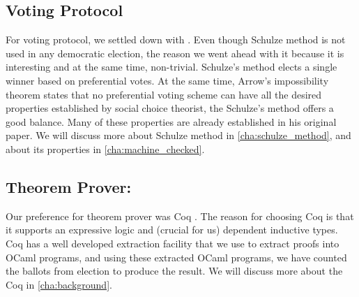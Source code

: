  \subsection{Voting Protocol}
 For voting protocol, we settled down with \cite{Schulze:2011:NMC}.
 Even though Schulze method is not used in any democratic election, the reason 
 we went ahead with it because it is interesting  and at the same time, non-trivial. 
 Schulze's method elects  a single winner based on 
preferential votes.  At the same time, Arrow's impossibility theorem \citep{Arrow:1950:DCS} states
 that no preferential voting 
scheme can have all the desired properties established by  social choice theorist,
the Schulze's method offers a good balance. Many of these properties are already 
established in his original paper.  We will discuss more about Schulze method in 
\ref{cha:schulze_method}, and about its properties in \ref{cha:machine_checked}. 

\subsection{Theorem Prover:}
Our preference for theorem prover was Coq \citep{Bertot:2004:ITP}. The 
reason for choosing Coq is that it supports an expressive logic and  (crucial for us) dependent 
inductive types.  Coq has a well developed extraction facility that 
we use to extract proofs into OCaml programs, and using these extracted OCaml programs, we 
have counted the ballots from election to produce the result.  We will discuss more about the Coq in 
\ref{cha:background}. 


